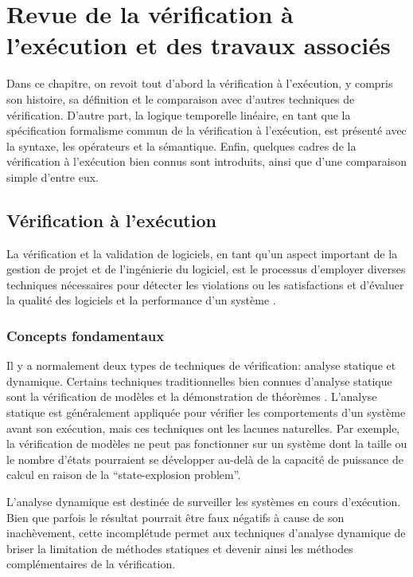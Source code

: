 
\chapter{Revue de la vérification à l'exécution et des travaux associés}

Dans ce chapitre, on revoit tout d'abord la vérification à l'exécution, y compris son histoire, sa définition et le comparaison avec d'autres techniques de vérification. D'autre part, la logique temporelle linéaire, en tant que la spécification formalisme commun de la vérification à l'exécution, est présenté avec la syntaxe, les opérateurs et la sémantique. Enfin, quelques cadres de la vérification à l'exécution bien connus sont introduits, ainsi que d'une comparaison simple d'entre eux.

\section{Vérification à l'exécution}

La vérification et la validation de logiciels, en tant qu'un aspect important de la gestion de projet et de l'ingénierie du logiciel, est le processus d'employer diverses techniques nécessaires pour détecter les violations ou les satisfactions et d'évaluer la qualité des logiciels et la performance d'un système \citep{ieeestd2012}.

\subsection{Concepts fondamentaux}

Il y a normalement deux types de techniques de vérification: analyse statique et dynamique. Certains techniques traditionnelles bien connues d'analyse statique sont la vérification de modèles \citep{clarke1999model} et la démonstration de théorèmes \citep{heisel1990tactical}. L'analyse statique est généralement appliquée pour vérifier les comportements d'un système avant son exécution, mais ces techniques ont les lacunes naturelles. Par exemple, la vérification de modèles ne peut pas fonctionner sur un système dont la taille ou le nombre d'états pourraient se développer au-delà de la capacité de puissance de calcul en raison de la ``state-explosion problem''.

L'analyse dynamique est destinée de surveiller les systèmes en cours d'exécution. Bien que parfois le résultat pourrait être faux négatifs à cause de son inachèvement, cette incomplétude permet aux techniques d'analyse dynamique de briser la limitation de méthodes statiques et devenir ainsi les méthodes complémentaires de la vérification. \citep{falcone2013tutorial}

